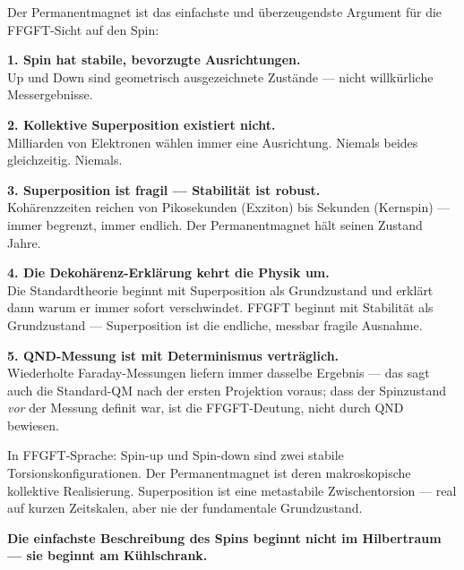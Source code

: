 \begin{conclusionBox}
Der Permanentmagnet ist das einfachste und überzeugendste
Argument für die FFGFT-Sicht auf den Spin:

\textbf{1. Spin hat stabile, bevorzugte Ausrichtungen.}\\
Up und Down sind geometrisch ausgezeichnete Zustände ---
nicht willkürliche Messergebnisse.

\textbf{2. Kollektive Superposition existiert nicht.}\\
Milliarden von Elektronen wählen immer eine Ausrichtung.
Niemals beides gleichzeitig. Niemals.

\textbf{3. Superposition ist fragil --- Stabilität ist robust.}\\
Kohärenzzeiten reichen von Pikosekunden (Exziton) bis
Sekunden (Kernspin) --- immer begrenzt, immer endlich.
Der Permanentmagnet hält seinen Zustand Jahre.

\textbf{4. Die Dekohärenz-Erklärung kehrt die Physik um.}\\
Die Standardtheorie beginnt mit Superposition als Grundzustand
und erklärt dann warum er immer sofort verschwindet.
FFGFT beginnt mit Stabilität als Grundzustand ---
Superposition ist die endliche, messbar fragile Ausnahme.

\textbf{5. QND-Messung ist mit Determinismus verträglich.}\\
Wiederholte Faraday-Messungen liefern immer dasselbe Ergebnis ---
das sagt auch die Standard-QM nach der ersten Projektion voraus;
dass der Spinzustand \emph{vor} der Messung definit war, ist die
FFGFT-Deutung, nicht durch QND bewiesen.

In FFGFT-Sprache:
Spin-up und Spin-down sind zwei stabile Torsionskonfigurationen.
Der Permanentmagnet ist deren makroskopische kollektive Realisierung.
Superposition ist eine metastabile Zwischentorsion ---
real auf kurzen Zeitskalen, aber nie der fundamentale Grundzustand.

\textbf{Die einfachste Beschreibung des Spins beginnt nicht im
Hilbertraum --- sie beginnt am Kühlschrank.}
\end{conclusionBox}


